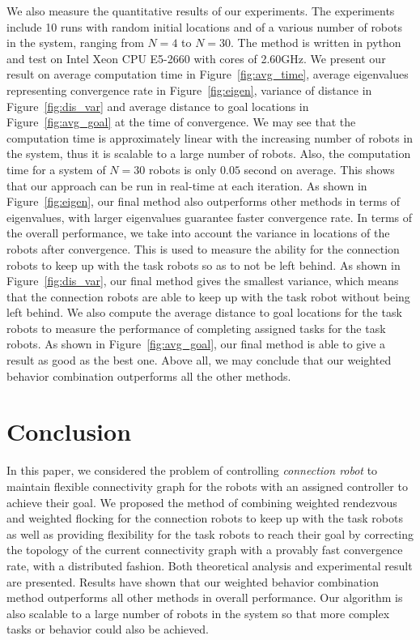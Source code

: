 \documentclass[../main.tex]{subfiles}
\begin{document}
We also measure the quantitative results of our experiments. The experiments include 10 runs with random initial locations and of a various number of robots in the system, ranging from $N=4$ to $N=30$. The method is written in python and test on Intel Xeon CPU E5-2660 with cores of 2.60GHz. We present our result on average computation time in Figure~\ref{fig:avg_time}, average eigenvalues representing convergence rate in Figure~\ref{fig:eigen}, variance of distance in Figure~\ref{fig:dis_var} and average distance to goal locations in Figure~\ref{fig:avg_goal} at the time of convergence. We may see that the computation time is approximately linear with the increasing number of robots in the system, thus it is scalable to a large number of robots. Also, the computation time for a system of $N=30$ robots is only $0.05$ second on average. This shows that our approach can be run in real-time at each iteration. As shown in Figure~\ref{fig:eigen}, our final method also outperforms other methods in terms of eigenvalues, with larger eigenvalues guarantee faster convergence rate. In terms of the overall performance, we take into account the variance in locations of the robots after convergence. This is used to measure the ability for the connection robots to keep up with the task robots so as to not be left behind. As shown in Figure~\ref{fig:dis_var}, our final method gives the smallest variance, which means that the connection robots are able to keep up with the task robot without being left behind. We also compute the average distance to goal locations for the task robots to measure the performance of completing assigned tasks for the task robots. As shown in Figure~\ref{fig:avg_goal}, our final method is able to give a result as good as the best one. Above all, we may conclude that our weighted behavior combination outperforms all the other methods.

\section{Conclusion}
In this paper, we considered the problem of controlling \textit{connection robot} to maintain flexible connectivity graph for the robots with an assigned controller to achieve their goal. We proposed the method of combining weighted rendezvous and weighted flocking for the connection robots to keep up with the task robots as well as providing flexibility for the task robots to reach their goal by correcting the topology of the current connectivity graph with a provably fast convergence rate, with a distributed fashion. Both theoretical analysis and experimental result are presented. Results have shown that our weighted behavior combination method outperforms all other methods in overall performance. Our algorithm is also scalable to a large number of robots in the system so that more complex tasks or behavior could also be achieved.
\end{document}
